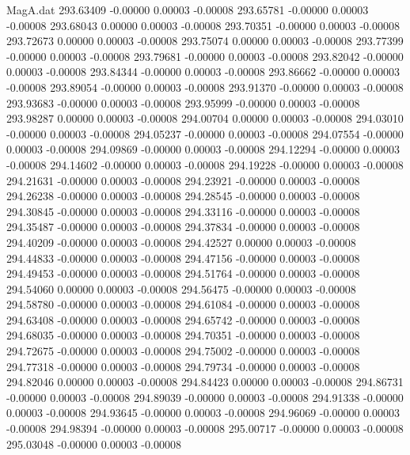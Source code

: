 \begin{filecontents}{MagA.dat}
 293.63409   -0.00000    0.00003   -0.00008
 293.65781   -0.00000    0.00003   -0.00008
 293.68043    0.00000    0.00003   -0.00008
 293.70351   -0.00000    0.00003   -0.00008
 293.72673    0.00000    0.00003   -0.00008
 293.75074    0.00000    0.00003   -0.00008
 293.77399   -0.00000    0.00003   -0.00008
 293.79681   -0.00000    0.00003   -0.00008
 293.82042   -0.00000    0.00003   -0.00008
 293.84344   -0.00000    0.00003   -0.00008
 293.86662   -0.00000    0.00003   -0.00008
 293.89054   -0.00000    0.00003   -0.00008
 293.91370   -0.00000    0.00003   -0.00008
 293.93683   -0.00000    0.00003   -0.00008
 293.95999   -0.00000    0.00003   -0.00008
 293.98287    0.00000    0.00003   -0.00008
 294.00704    0.00000    0.00003   -0.00008
 294.03010   -0.00000    0.00003   -0.00008
 294.05237   -0.00000    0.00003   -0.00008
 294.07554   -0.00000    0.00003   -0.00008
 294.09869   -0.00000    0.00003   -0.00008
 294.12294   -0.00000    0.00003   -0.00008
 294.14602   -0.00000    0.00003   -0.00008
 294.19228   -0.00000    0.00003   -0.00008
 294.21631   -0.00000    0.00003   -0.00008
 294.23921   -0.00000    0.00003   -0.00008
 294.26238   -0.00000    0.00003   -0.00008
 294.28545   -0.00000    0.00003   -0.00008
 294.30845   -0.00000    0.00003   -0.00008
 294.33116   -0.00000    0.00003   -0.00008
 294.35487   -0.00000    0.00003   -0.00008
 294.37834   -0.00000    0.00003   -0.00008
 294.40209   -0.00000    0.00003   -0.00008
 294.42527    0.00000    0.00003   -0.00008
 294.44833   -0.00000    0.00003   -0.00008
 294.47156   -0.00000    0.00003   -0.00008
 294.49453   -0.00000    0.00003   -0.00008
 294.51764   -0.00000    0.00003   -0.00008
 294.54060    0.00000    0.00003   -0.00008
 294.56475   -0.00000    0.00003   -0.00008
 294.58780   -0.00000    0.00003   -0.00008
 294.61084   -0.00000    0.00003   -0.00008
 294.63408   -0.00000    0.00003   -0.00008
 294.65742   -0.00000    0.00003   -0.00008
 294.68035   -0.00000    0.00003   -0.00008
 294.70351   -0.00000    0.00003   -0.00008
 294.72675   -0.00000    0.00003   -0.00008
 294.75002   -0.00000    0.00003   -0.00008
 294.77318   -0.00000    0.00003   -0.00008
 294.79734   -0.00000    0.00003   -0.00008
 294.82046    0.00000    0.00003   -0.00008
 294.84423    0.00000    0.00003   -0.00008
 294.86731   -0.00000    0.00003   -0.00008
 294.89039   -0.00000    0.00003   -0.00008
 294.91338   -0.00000    0.00003   -0.00008
 294.93645   -0.00000    0.00003   -0.00008
 294.96069   -0.00000    0.00003   -0.00008
 294.98394   -0.00000    0.00003   -0.00008
 295.00717   -0.00000    0.00003   -0.00008
 295.03048   -0.00000    0.00003   -0.00008

\end{filecontents}
